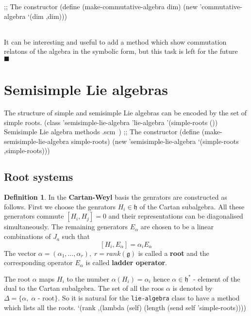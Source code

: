 \documentclass[a4paper,10pt]{article}
\theoremstyle{definition} \newtheorem{Def}{Definition}
\newenvironment{comment}
{\par\noindent{\bf TODO}\\}
{\\\hfill$\scriptstyle\blacksquare$\par}
\begin{document}
;; The constructor
(define (make-commutative-algebra dim)
  (new 'commutative-algebra `(dim ,dim)))
\nwendcode{}\nwdocspar
\begin{comment}
It can be interesting and useful to add a method which show commutation relatons of the algebra in the symbolic form, but this task is left for the future  
\end{comment}
\nwenddocs{}\nwdocspar

\section{Semisimple Lie algebras}
\label{sec:semis-lie-algebra}
The structure of simple and semisimple Lie algebras can be encoded by the set of simple roots. 
\nwenddocs{}\endmoddef
(class 'semisimple-lie-algebra 'lie-algebra
       '(simple-roots ())
       \LA{}Semisimple Lie algebra methods .scm~{\nwtagstyle{}}\RA{})
;; The constructor
(define (make-semisimple-lie-algebra simple-roots)
  (new 'semisimple-lie-algebra `(simple-roots ,simple-roots)))

\nwendcode{}\nwdocspar

\subsection{Root systems}
\label{sec:root-systems}
\begin{Def}
  In the {\bf Cartan-Weyl} basis the genrators are constructed as follows.
  First we choose the genrators $H_i\in \mathfrak{h}$ of the Cartan subalgebra. All these generators commute $[H_i,H_j]=0$ and their representations can be diagonalised simultaneously. The remaining generators $E_{\alpha}$ are chosen to be a linear combinations of $J_a$ such that
  \begin{equation}
    \label{eq:4}
    [H_i,E_{\alpha}]=\alpha_i E_{\alpha}
  \end{equation}
  The vector $\alpha=(\alpha_1,\dots,\alpha_r),\; r=rank(\mathfrak{g})$ is called a {\bf root} and the corresponding operator $E_{\alpha}$ is called {\bf ladder operator}.
\end{Def}
The root $\alpha$ maps $H_i$ to the number $\alpha(H_i)=\alpha_i$ hence $\alpha\in \mathfrak{h}^{*}$ - element of the dual to the Cartan subalgebra. The set of all the roos $\alpha$ is denoted by $\Delta=\{\alpha,\; \alpha \text{ - root}\}$. So it is natural for the {\tt{}lie-algebra} class to have a method which lists all the roots.
\nwenddocs{}\endmoddef
`(rank ,(lambda (self)
    (length (send self 'simple-roots))))
       
\end{document}
